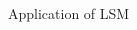 \begin{frame}{Application of LSM}
\begin{columns}[T]
\begin{column}[T]{.47\textwidth}
{\begin{figure}
            \centering
            \scalebox{0.6}{
            
            }
        \end{figure}
        }
    \end{column}
\end{columns}
\end{frame}